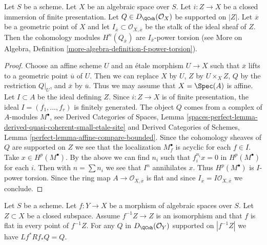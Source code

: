 \begin{lemma}
\label{lemma-stalk-of-module-with-support}
Let $S$ be a scheme. Let $X$ be an algebraic space over $S$.
Let $i : Z \to X$ be a closed immersion of finite presentation.
Let $Q \in D_\QCoh(\mathcal{O}_X)$ be supported on $|Z|$.
Let $\overline{x}$ be a geometric point of $X$ and let
$I_{\overline{x}} \subset \mathcal{O}_{X, \overline{x}}$ be the stalk of
the ideal sheaf of $Z$. Then the cohomology modules
$H^n(Q_{\overline{x}})$ are $I_{\overline{x}}$-power torsion
(see More on Algebra, Definition
\ref{more-algebra-definition-f-power-torsion}).
\end{lemma}

\begin{proof}
Choose an affine scheme $U$ and an \'etale morphism $U \to X$ such
that $\overline{x}$ lifts to a geometric point $\overline{u}$
of $U$. Then we can replace $X$ by $U$, $Z$ by $U \times_X Z$,
$Q$ by the restriction $Q|_U$, and $\overline{x}$ by $\overline{u}$.
Thus we may assume that $X = \Spec(A)$ is affine. Let $I \subset A$
be the ideal defining $Z$. Since $i : Z \to X$ is of finite presentation,
the ideal $I = (f_1, \ldots, f_r)$ is finitely generated.
The object $Q$ comes from a complex of $A$-modules $M^\bullet$, see
Derived Categories of Spaces, Lemma
\ref{spaces-perfect-lemma-derived-quasi-coherent-small-etale-site}
and
Derived Categories of Schemes, Lemma
\ref{perfect-lemma-affine-compare-bounded}.
Since the cohomology sheaves of $Q$ are supported on $Z$
we see that the localization $M^\bullet_f$ is acyclic for each $f \in I$.
Take $x \in H^p(M^\bullet)$. By the above we can find $n_i$ such
that $f_i^{n_i} x = 0$ in $H^p(M^\bullet)$ for each $i$.
Then with $n = \sum n_i$ we see that $I^n$ annihilates $x$.
Thus $H^p(M^\bullet)$ is $I$-power torsion. Since the ring
map $A \to \mathcal{O}_{X, \overline{x}}$ is flat and since
$I_{\overline{x}} = I\mathcal{O}_{X, \overline{x}}$ we conclude.
\end{proof}

\begin{lemma}
\label{lemma-formal-glueing-on-closed}
Let $S$ be a scheme. Let $f : Y \to X$ be a morphism of algebraic spaces
over $S$. Let $Z \subset X$ be a closed subspace. Assume $f^{-1}Z \to Z$
is an isomorphism and that $f$ is flat in every point of $f^{-1}Z$. For any
$Q$ in $D_\QCoh(\mathcal{O}_Y)$ supported on $|f^{-1}Z|$ we have
$Lf^*Rf_*Q = Q$.
\end{lemma}

